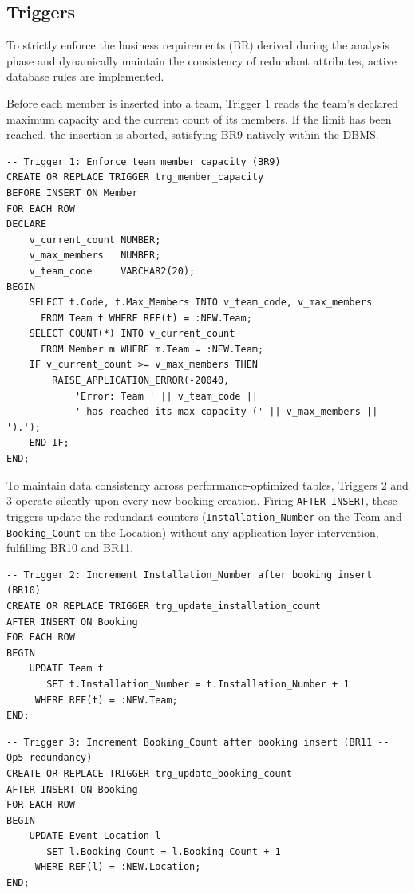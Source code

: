\documentclass[12pt]{article}
\begin{document}
\subsection{Triggers}

To strictly enforce the business requirements (BR) derived during the analysis phase and dynamically maintain the consistency of redundant attributes, active database rules are implemented. 

Before each member is inserted into a team, Trigger 1 reads the team's declared maximum capacity and the current count of its members. If the limit has been reached, the insertion is aborted, satisfying BR9 natively within the DBMS.

\begin{lstlisting}
-- Trigger 1: Enforce team member capacity (BR9)
CREATE OR REPLACE TRIGGER trg_member_capacity
BEFORE INSERT ON Member
FOR EACH ROW
DECLARE
    v_current_count NUMBER;
    v_max_members   NUMBER;
    v_team_code     VARCHAR2(20);
BEGIN
    SELECT t.Code, t.Max_Members INTO v_team_code, v_max_members
      FROM Team t WHERE REF(t) = :NEW.Team;
    SELECT COUNT(*) INTO v_current_count
      FROM Member m WHERE m.Team = :NEW.Team;
    IF v_current_count >= v_max_members THEN
        RAISE_APPLICATION_ERROR(-20040,
            'Error: Team ' || v_team_code ||
            ' has reached its max capacity (' || v_max_members || ').');
    END IF;
END;
\end{lstlisting}

To maintain data consistency across performance-optimized tables, Triggers 2 and 3 operate silently upon every new booking creation. Firing \texttt{AFTER INSERT}, these triggers update the redundant counters (\texttt{Installation\_Number} on the Team and \texttt{Booking\_Count} on the Location) without any application-layer intervention, fulfilling BR10 and BR11.

\begin{lstlisting}
-- Trigger 2: Increment Installation_Number after booking insert (BR10)
CREATE OR REPLACE TRIGGER trg_update_installation_count
AFTER INSERT ON Booking
FOR EACH ROW
BEGIN
    UPDATE Team t
       SET t.Installation_Number = t.Installation_Number + 1
     WHERE REF(t) = :NEW.Team;
END;
\end{lstlisting}

\begin{lstlisting}
-- Trigger 3: Increment Booking_Count after booking insert (BR11 -- Op5 redundancy)
CREATE OR REPLACE TRIGGER trg_update_booking_count
AFTER INSERT ON Booking
FOR EACH ROW
BEGIN
    UPDATE Event_Location l
       SET l.Booking_Count = l.Booking_Count + 1
     WHERE REF(l) = :NEW.Location;
END;
\end{lstlisting}
\end{document}
